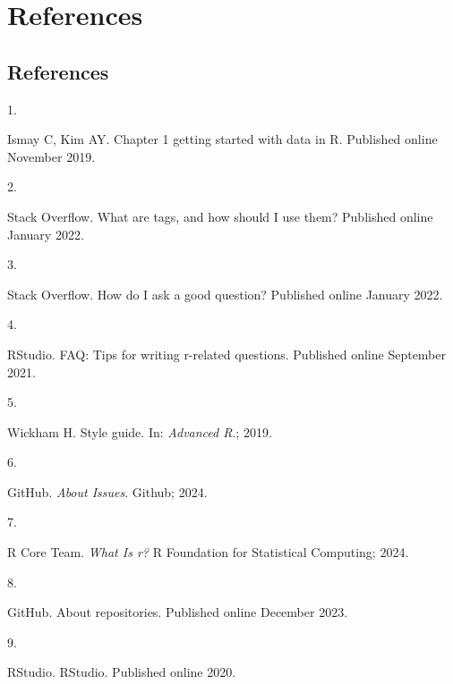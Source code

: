 \documentclass[
  letterpaper,
  DIV=11,
  numbers=noendperiod]{scrreprt}
\newlength{\cslhangindent}
\newlength{\csllabelwidth}
\newenvironment{CSLReferences}[2] %
 {\begin{list}{}{%
  \setlength{\itemindent}{0pt}
  \setlength{\leftmargin}{0pt}
  \setlength{\parsep}{0pt}
  \ifodd #1
   \setlength{\leftmargin}{\cslhangindent}
   \setlength{\itemindent}{-1\cslhangindent}
  \fi
  \setlength{\itemsep}{#2\baselineskip}}}
 {\end{list}}
\newcommand{\CSLLeftMargin}[1]{\parbox[t]{\csllabelwidth}{\strut#1\strut}}
\newcommand{\CSLRightInline}[1]{\parbox[t]{\linewidth - \csllabelwidth}{\strut#1\strut}}
\begin{document}
\part{References}

\chapter*{References}\label{references-1}


\label{refs}
\begin{CSLReferences}{0}{1}
\CSLLeftMargin{1. }%
\CSLRightInline{Ismay C, Kim AY. Chapter 1 getting started with data in
{R}. Published online November 2019.}

\CSLLeftMargin{2. }%
\CSLRightInline{Stack Overflow. What are tags, and how should {I} use
them? Published online January 2022.}

\CSLLeftMargin{3. }%
\CSLRightInline{Stack Overflow. How do {I} ask a good question?
Published online January 2022.}

\CSLLeftMargin{4. }%
\CSLRightInline{RStudio. {FAQ}: Tips for writing r-related questions.
Published online September 2021.}

\CSLLeftMargin{5. }%
\CSLRightInline{Wickham H. Style guide. In: \emph{Advanced {R}}.; 2019.}

\CSLLeftMargin{6. }%
\CSLRightInline{GitHub. \emph{About Issues}. Github; 2024.}

\CSLLeftMargin{7. }%
\CSLRightInline{R Core Team. \emph{What Is r?} R Foundation for
Statistical Computing; 2024.}

\CSLLeftMargin{8. }%
\CSLRightInline{GitHub. About repositories. Published online December
2023.}

\CSLLeftMargin{9. }%
\CSLRightInline{RStudio. {RStudio}. Published online 2020.}

\end{CSLReferences}

\cleardoublepage
{}
{}
\appendix
\end{document}
